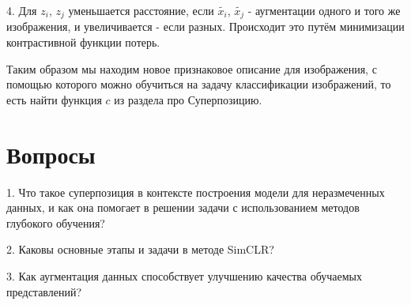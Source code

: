 \documentclass{article}
\begin{document}
4. Для $z_i$, $z_j$ уменьшается расстояние, если $\tilde{x_i}$, $\tilde{x_j}$ - аугментации одного и того же изображения, и увеличивается - если разных. Происходит это путём минимизации контрастивной функции потерь. 

Таким образом мы находим новое признаковое описание для изображения, с помощью которого можно обучиться на задачу классификации изображений, то есть найти функция $c$ из раздела про Суперпозицию.

\section{Вопросы}
\hspace{2em}1. Что такое суперпозиция в контексте построения модели для неразмеченных данных, и как она помогает в решении задачи с использованием методов глубокого обучения?

2. Каковы основные этапы и задачи в методе SimCLR?

3. Как аугментация данных способствует улучшению качества обучаемых представлений?
\end{document}
